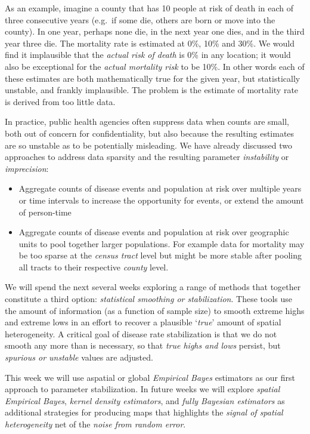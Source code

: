 \documentclass[
]{book}
\providecommand{\tightlist}{%
  \setlength{\itemsep}{0pt}\setlength{\parskip}{0pt}}
\begin{document}
As an example, imagine a county that has 10 people at risk of death in each of three consecutive years (e.g.~if some die, others are born or move into the county). In one year, perhaps none die, in the next year one dies, and in the third year three die. The mortality rate is estimated at 0\%, 10\% and 30\%. We would find it implausible that the \emph{actual risk of death} is 0\% in any location; it would also be exceptional for the \emph{actual mortality risk} to be 10\%. In other words each of these estimates are both mathematically true for the given year, but statistically unstable, and frankly implausible. The problem is the estimate of mortality rate is derived from too little data.

In practice, public health agencies often suppress data when counts are small, both out of concern for confidentiality, but also because the resulting estimates are so unstable as to be potentially misleading. We have already discussed two approaches to address data sparsity and the resulting parameter \emph{instability} or \emph{imprecision}:

\begin{itemize}
\tightlist
\item
  Aggregate counts of disease events and population at risk over multiple years or time intervals to increase the opportunity for events, or extend the amount of person-time
\item
  Aggregate counts of disease events and population at risk over geographic units to pool together larger populations. For example data for mortality may be too sparse at the \emph{census tract} level but might be more stable after pooling all tracts to their respective \emph{county} level.
\end{itemize}

We will spend the next several weeks exploring a range of methods that together constitute a third option: \emph{statistical smoothing or stabilization}. These tools use the amount of information (as a function of sample size) to smooth extreme highs and extreme lows in an effort to recover a plausible `\emph{true}' amount of spatial heterogeneity. A critical goal of disease rate stabilization is that we do not smooth any more than is necessary, so that \emph{true highs and lows} persist, but \emph{spurious or unstable} values are adjusted.

This week we will use aspatial or global \emph{Empirical Bayes} estimators as our first approach to parameter stabilization. In future weeks we will explore \emph{spatial Empirical Bayes}, \emph{kernel density estimators}, and \emph{fully Bayesian estimators} as additional strategies for producing maps that highlights the \emph{signal of spatial heterogeneity} net of the \emph{noise from random error}.
\end{document}
